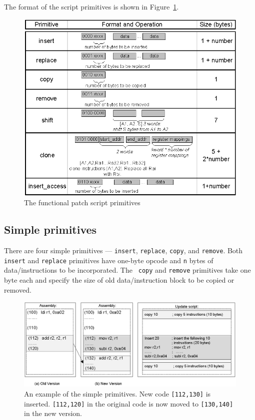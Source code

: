 The format of the script primitives is shown in Figure~\ref{fscript}. 

\begin{figure}[htbp]
\centering
\includegraphics[scale=1.2]{figures/fopcode.eps}
\caption{The functional patch script primitives}
\label{fscript}
\end{figure}


\subsection{Simple primitives}

There are four simple primitives --- {\tt insert}, {\tt replace}, {\tt copy}, and {\tt remove}. Both {\tt insert} and 
{\tt replace} primitives have one-byte opcode and {\tt n} bytes of data/instructions to be incorporated.  The {\tt 
copy} and {\tt remove} primitives take one byte each and specify the size of old data/instruction block to be
copied or removed.

\begin{figure}[htbp]
\centering
\includegraphics[width=6in]{figures/sother.eps}
\caption[An example of the simple primitives.]{An example of the simple primitives. 
New code {\tt [112,130]} is inserted.
{\tt [112,120]} in the original code is now moved to {\tt [130,140]} 
in the new version.
}
\label{fsother}
\end{figure}

